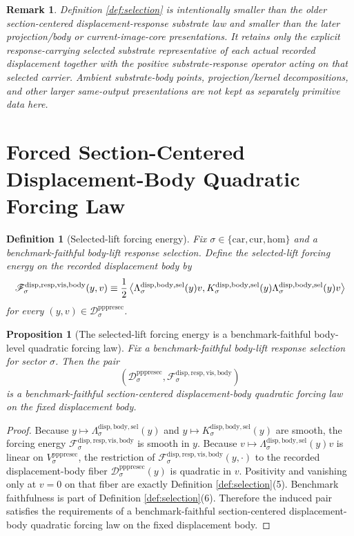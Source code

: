 \documentclass[11pt]{article}
\newcommand{\Car}{\mathrm{car}}
\newcommand{\Cur}{\mathrm{cur}}
\newcommand{\Hom}{\mathrm{hom}}
\newcommand{\PrePreProtoSectionVertical}[1]{V_{#1}^{\mathrm{pppresec}}}
\newcommand{\PrePreProtoSectionResidualBody}[1]{\mathcal D_{#1}^{\mathrm{pppresec}}}
\newcommand{\VisibleBodyForcingLaw}[1]{\mathscr F_{#1}^{\mathrm{disp,resp,vis,body}}}
\newcommand{\SelectedResponseLift}[1]{\Lambda_{#1}^{\mathrm{disp,body,sel}}}
\newcommand{\SelectedResponseOperator}[1]{K_{#1}^{\mathrm{disp,body,sel}}}
\newtheorem{definition}{Definition}
\newtheorem{proposition}{Proposition}
\newtheorem{remark}{Remark}
\begin{document}
\begin{remark}
Definition \ref{def:selection} is intentionally smaller than the older section-centered displacement-response substrate law and smaller than the later projection/body or current-image-core presentations. It retains only the explicit response-carrying selected substrate representative of each actual recorded displacement together with the positive substrate-response operator acting on that selected carrier. Ambient substrate-body points, projection/kernel decompositions, and other larger same-output presentations are not kept as separately primitive data here.
\end{remark}

\section{Forced Section-Centered Displacement-Body Quadratic Forcing Law}

\begin{definition}[Selected-lift forcing energy]
\label{def:energy}
Fix \(\sigma\in\{\Car,\Cur,\Hom\}\) and a benchmark-faithful body-lift response selection. Define the selected-lift forcing energy on the recorded displacement body by
\begin{equation}
\VisibleBodyForcingLaw{\sigma}(y,v)
\equiv
\frac{1}{2}
\ev{
\SelectedResponseLift{\sigma}(y)v,
\SelectedResponseOperator{\sigma}(y)\SelectedResponseLift{\sigma}(y)v
}
\label{eq:forcing}
\end{equation}
for every \((y,v)\in\PrePreProtoSectionResidualBody{\sigma}\).
\end{definition}

\begin{proposition}[The selected-lift forcing energy is a benchmark-faithful body-level quadratic forcing law]
\label{prop:law}
Fix a benchmark-faithful body-lift response selection for sector \(\sigma\). Then the pair
\[
\left(
\PrePreProtoSectionResidualBody{\sigma},
\VisibleBodyForcingLaw{\sigma}
\right)
\]
is a benchmark-faithful section-centered displacement-body quadratic forcing law on the fixed displacement body.
\end{proposition}

\begin{proof}
Because \(y\mapsto \SelectedResponseLift{\sigma}(y)\) and \(y\mapsto \SelectedResponseOperator{\sigma}(y)\) are smooth, the forcing energy \(\VisibleBodyForcingLaw{\sigma}\) is smooth in \(y\). Because \(v\mapsto \SelectedResponseLift{\sigma}(y)v\) is linear on \(\PrePreProtoSectionVertical{\sigma}\), the restriction of \(\VisibleBodyForcingLaw{\sigma}(y,\cdot)\) to the recorded displacement-body fiber \(\PrePreProtoSectionResidualBody{\sigma}(y)\) is quadratic in \(v\). Positivity and vanishing only at \(v=0\) on that fiber are exactly Definition \ref{def:selection}(5). Benchmark faithfulness is part of Definition \ref{def:selection}(6). Therefore the induced pair satisfies the requirements of a benchmark-faithful section-centered displacement-body quadratic forcing law on the fixed displacement body.
\end{proof}
\end{document}
